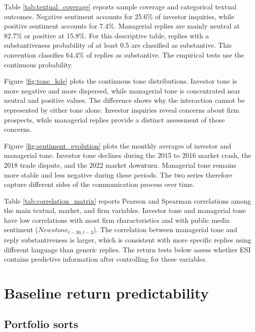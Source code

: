 \documentclass[12pt]{article}
\begin{document}
Table \ref{tab:textual_coverage} reports sample coverage and categorical textual outcomes. Negative sentiment accounts for 25.6\% of investor inquiries, while positive sentiment accounts for 7.4\%. Managerial replies are mainly neutral at 82.7\% or positive at 15.8\%. For this descriptive table, replies with a substantiveness probability of at least 0.5 are classified as substantive. This convention classifies 64.4\% of replies as substantive. The empirical tests use the continuous probability.

Figure \ref{fig:tone_kde} plots the continuous tone distributions. Investor tone is more negative and more dispersed, while managerial tone is concentrated near neutral and positive values. The difference shows why the interaction cannot be represented by either tone alone. Investor inquiries reveal concerns about firm prospects, while managerial replies provide a distinct assessment of those concerns.

Figure \ref{fig:sentiment_evolution} plots the monthly averages of investor and managerial tone. Investor tone declines during the 2015 to 2016 market crash, the 2018 trade dispute, and the 2022 market downturn. Managerial tone remains more stable and less negative during these periods. The two series therefore capture different sides of the communication process over time.

Table \ref{tab:correlation_matrix} reports Pearson and Spearman correlations among the main textual, market, and firm variables. Investor tone and managerial tone have low correlations with most firm characteristics and with public media sentiment ($Newstone_{t-30,t-3}$). The correlation between managerial tone and reply substantiveness is larger, which is consistent with more specific replies using different language than generic replies. The return tests below assess whether ESI contains predictive information after controlling for these variables.
\section{Baseline return predictability}\label{sec:baseline_return_predictability}
 

\subsection{Portfolio sorts}
\end{document}
